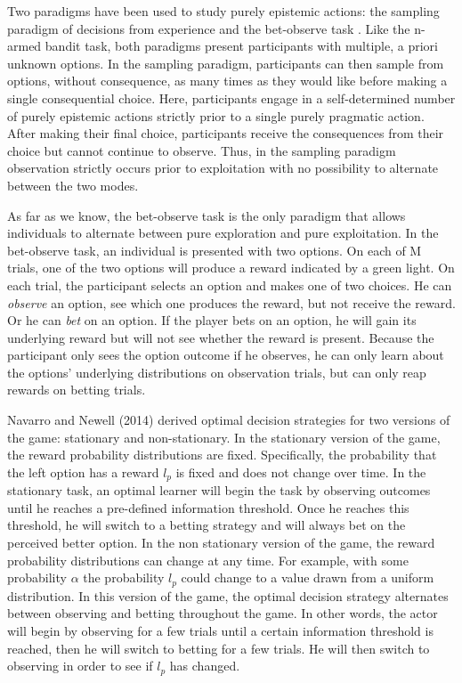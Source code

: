 \documentclass[a4paper,doc,natbib,floatsintext]{apa6}
\begin{document}
Two paradigms have been used to study purely epistemic actions: the sampling paradigm of decisions from experience \citep{hertwig2004decisions} and the bet-observe task \citep{tversky1966information}. Like the n-armed bandit task, both paradigms present participants with multiple, a priori unknown options. In the sampling paradigm, participants can then sample from options, without consequence, as many times as they would like before making a single consequential choice. Here, participants engage in a self-determined number of purely epistemic actions strictly prior to a single purely pragmatic action. After making their final choice, participants receive the consequences from their choice but cannot continue to observe. Thus, in the sampling paradigm observation strictly occurs prior to exploitation with no possibility to alternate between the two modes.

As far as we know, the bet-observe task is the only paradigm that allows individuals to alternate between pure exploration and pure exploitation. In the bet-observe task, an individual is presented with two options. On each of M trials, one of the two options will produce a reward indicated by a green light. On each trial, the participant selects an option and makes one of two choices. He can \textit{observe} an option, see which one produces the reward, but not receive the reward. Or he can \textit{bet} on an option. If the player bets on an option, he will gain its underlying reward but will not see whether the reward is present. Because the participant only sees the option outcome if he observes, he can only learn about the options' underlying distributions on observation trials, but can only reap rewards on betting trials.

Navarro and Newell (2014) derived optimal decision strategies for two versions of the game: stationary and non-stationary. In the stationary version of the game, the reward probability distributions are fixed. Specifically, the probability that the left option has a reward $l_{p}$ is fixed and does not change over time. In the stationary task, an optimal learner will begin the task by observing outcomes until he reaches a pre-defined information threshold. Once he reaches this threshold, he will switch to a betting strategy and will always bet on the perceived better option. In the non stationary version of the game, the reward probability distributions can change at any time. For example, with some probability $\alpha$ the probability $l_{p}$ could change to a value drawn from a uniform distribution. In this version of the game, the optimal decision strategy alternates between observing and betting throughout the game. In other words, the actor will begin by observing for a few trials until a certain information threshold is reached, then he will switch to betting for a few trials. He will then switch to observing in order to see if $l_{p}$ has changed.
\end{document}
